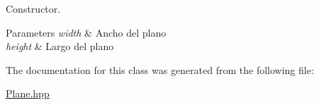 Constructor. 


\begin{DoxyParams}{Parameters}
{\em width} & Ancho del plano \\
\hline
{\em height} & Largo del plano \\
\hline
\end{DoxyParams}


The documentation for this class was generated from the following file\+:\begin{DoxyCompactItemize}
\item 
\mbox{\hyperlink{_plane_8hpp}{Plane.\+hpp}}\end{DoxyCompactItemize}
